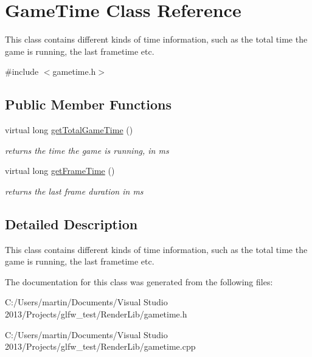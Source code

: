 \hypertarget{class_game_time}{}\section{Game\+Time Class Reference}
\label{class_game_time}


This class contains different kinds of time information, such as the total time the game is running, the last frametime etc.  




{\ttfamily \#include $<$gametime.\+h$>$}

\subsection*{Public Member Functions}
\begin{DoxyCompactItemize}
\item 
\mbox{\label{class_game_time_ac95dfc025f3d267486029edd1d57f9be}} 
virtual long \hyperlink{class_game_time_ac95dfc025f3d267486029edd1d57f9be}{get\+Total\+Game\+Time} ()
\begin{DoxyCompactList}\small\item\em returns the time the game is running, in ms \end{DoxyCompactList}\item 
\mbox{\label{class_game_time_a02a9beaaa0b5ea0ea0619a275996239b}} 
virtual long \hyperlink{class_game_time_a02a9beaaa0b5ea0ea0619a275996239b}{get\+Frame\+Time} ()
\begin{DoxyCompactList}\small\item\em returns the last frame duration in ms \end{DoxyCompactList}\end{DoxyCompactItemize}


\subsection{Detailed Description}
This class contains different kinds of time information, such as the total time the game is running, the last frametime etc. 

The documentation for this class was generated from the following files\+:\begin{DoxyCompactItemize}
\item 
C\+:/\+Users/martin/\+Documents/\+Visual Studio 2013/\+Projects/glfw\+\_\+test/\+Render\+Lib/gametime.\+h\item 
C\+:/\+Users/martin/\+Documents/\+Visual Studio 2013/\+Projects/glfw\+\_\+test/\+Render\+Lib/gametime.\+cpp\end{DoxyCompactItemize}
